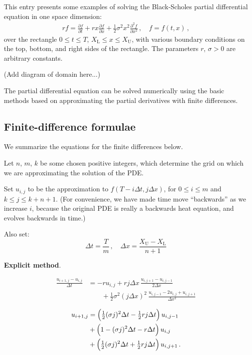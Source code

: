 \documentclass[12pt]{article}
\providecommand{\pd}[2]{\frac{\partial #1}{\partial #2}}
\providecommand{\pdd}[2]{\frac{\partial^2 #1}{\partial #2}}
\newcommand{\Dt}{\Delta t}
\newcommand{\Dx}{\Delta x}
\newcommand{\XL}{X_\mathrm{L}}
\newcommand{\XU}{X_\mathrm{U}}
\begin{document}
This entry presents some examples of solving
the Black-Scholes partial differential equation
in one space dimension:
\begin{align*}
rf = \pd{f}{t} + rx \pd{f}{x} + \tfrac12 \sigma^2 x^2 \pdd{f}{x^2}\,,
\quad f = f(t,x)\,,
\end{align*}
over the rectangle $0 \leq t \leq T$, $\XL \leq x \leq \XU$,
with various boundary conditions on the top, bottom, and right
sides of the rectangle.  The parameters $r$, $\sigma > 0$
are arbitrary constants.

(Add diagram of domain here...)

The partial differential equation can be solved
numerically using the basic methods
based on approximating the partial derivatives
with finite differences.

\subsection{Finite-difference formulae}

We summarize the equations for the finite differences below.

Let $n$, $m$, $k$ be some chosen positive integers,
which determine the grid on which we are approximating the solution
of the PDE.

Set $u_{i,j}$ to be the approximation to $f(T - i \Dt, j \Dx)$,
for $0 \leq i \leq m$ and $k \leq j \leq k+n+1$.
(For convenience, we have made time move ``backwards''
as we increase $i$, because the original PDE
is really a backwards heat equation, and evolves backwards in time.)

Also set:
\[
\Delta t = \frac{T}{m}\,, \quad \Delta x = \frac{\XU - \XL}{n+1}
\]


\textbf{Explicit method}.

\begin{align*}
\frac{u_{i+1, j} - u_{i, j}}{\Dt}
&= 
-r u_{i,j} + r j \Dx \, \frac{u_{i,j+1}- u_{i,j-1}}{2\Dx} \\
& \qquad
+ \frac12 \sigma^2 (j \Dx)^2 \, 
\frac{ u_{i,j-1} - 2u_{i,j} + u_{i,j+1}}{\Dx^2}
\end{align*}

\begin{align*}
u_{i+1, j} &= 
\Bigl( \tfrac12 (\sigma j)^2 \Dt - \tfrac12 rj \Dt \Bigr) \, u_{i,j-1} \\
& +
\Bigl( 1 - (\sigma j)^2 \Dt - r \Dt \Bigr) \, u_{i,j} \\
& +
\Bigl( \tfrac12 (\sigma j)^2 \Dt + \tfrac12 rj \Dt \Bigr) \, u_{i,j+1}\,.
\end{align*}
\end{document}
